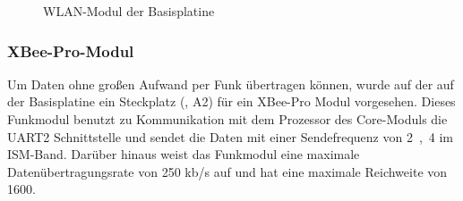 \begin{figure}[htb]
    \centering
    \qquad
    \qquad
    \caption[WLAN-Modul der Basisplatine]{WLAN-Modul der \gls{Basisplatine}}
    \label{fig:basisplatine-wlan}
\end{figure}

\subsubsection{XBee-Pro-Modul}
Um Daten ohne großen Aufwand per Funk übertragen können, wurde auf der auf der \gls{Basisplatine} ein Steckplatz (, A2) für ein XBee-Pro Modul vorgesehen. Dieses Funkmodul benutzt zu Kommunikation mit dem Prozessor des \gls{Core-Modul}s die UART2 Schnittstelle und sendet die Daten mit einer Sendefrequenz von \unit{2,4}{\giga\hertz} im ISM-Band. Darüber hinaus weist das Funkmodul eine maximale Datenübertragungsrate von 250 kb/s auf und hat eine maximale Reichweite von \unit{1600}{\metre}.

